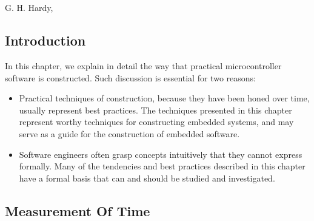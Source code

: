 
\chapter{\cpcozerolongtitle{}}

\label{cpco0}

                     {G. H. Hardy, \cite{bibref:b:mathematiciansapology:1940}}

\section{Introduction}
\label{cpco0:sint0}

In this chapter, we explain in detail the way that
practical microcontroller software is constructed.
Such discussion is essential for two reasons:

\begin{itemize}
\item Practical techniques of construction, because they have 
      been honed over time, usually represent best practices.
      The techniques presented in this chapter represent worthy
      techniques for constructing embedded systems, and may
      serve as a guide for the construction of embedded software.
\item Software engineers often grasp concepts intuitively that they
      cannot express formally.  Many of the tendencies and best practices
      described in this chapter have a formal basis that can and should be
      studied and investigated.
\end{itemize}


\section{Measurement Of Time}
\label{cpco0:smot0}


